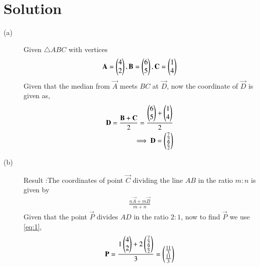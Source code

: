 \documentclass[journal,12pt,twocolumn]{IEEEtran}
\begin{document}
\section{Solution}
\begin{description}
\item [(a)] Given $\triangle ABC$ with vertices
\begin{align}
  \mathbf{A} = \begin{pmatrix}4 \\ 2\end{pmatrix}, \mathbf{B}=\begin{pmatrix}6 \\ 5\end{pmatrix},         \mathbf{C}=\begin{pmatrix}1 \\ 4\end{pmatrix}  
\end{align}
Given that the median from $\vec{A}$ meets $BC$ at $\vec{D}$, now the coordinate of $\vec{D}$ is given as,
\begin{align}
    \mathbf{D} = \frac{\mathbf{B}+\mathbf{C}}{2} = \frac{\begin{pmatrix}6 \\ 5\end{pmatrix}+\begin{pmatrix}1 \\ 4\end{pmatrix}}{2}\\
    \implies \mathbf{D} = \begin{pmatrix}\frac{7}{2} \\ \frac{9}{2}\end{pmatrix}
\end{align}
\end{description}
\begin{description}
\item [(b)] Result :The coordinates of point $\vec{C}$ dividing the line $AB$ in the ratio $m:n$ is given by 
\begin{align}
  \frac{n\vec{A}+m\vec{B}}{m+n}  \label{eq:1}
\end{align}
Given that the point $\vec{P}$ divides $AD$ in the ratio $2:1$, now to find $\vec{P}$ we use \eqref{eq:1},
\begin{align}
    \mathbf{P}=\frac{1\begin{pmatrix}4\\2\end{pmatrix}+2\begin{pmatrix}\frac{7}{2}\\ \frac{9}{2}\end{pmatrix}}{3}=\begin{pmatrix}\frac{11}{3} \\ \frac{11}{3}\end{pmatrix}
\end{align}
\end{description}
\end{document}

